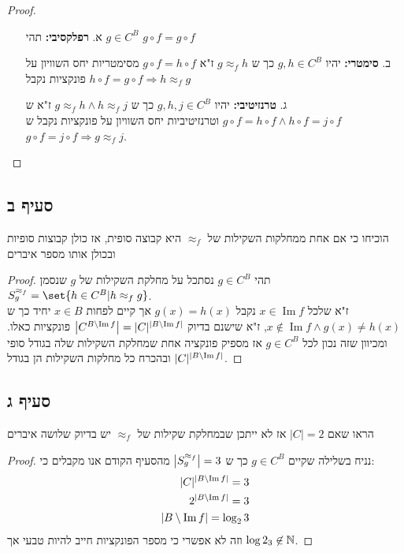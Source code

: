 \documentclass{article}
\DeclarePairedDelimiter\set\{\}
\DeclareMathOperator{\Img}{Im}
\begin{document}
	\begin{proof}
		\begin{itemize}
			\item[א.] \textbf{רפלקסיבי:} תהי $g \in C^B$ $g \circ f = g \circ f$
			\item[ב.] \textbf{סימטרי:} יהיו $g,h \in C^B$ כך ש $g \approx_f h$ ז"א $g \circ f = h \circ f$ מסימטריות יחס השוויון על פונקציות נקבל $h \circ f = g \circ f \Rightarrow h \approx_f g$
			\item[ג.] \textbf{טרנזיטיבי:} יהיו $g,h,j \in C^B$ כך ש $g \approx_f h \land h \approx_f j$ ז"א ש $g \circ f = h \circ f \land h \circ f = j \circ f$ וטרנזיטיביות יחס השוויון על פונקציות נקבל ש $g \circ f = j \circ f \Rightarrow g \approx_f j$.
		\end{itemize}
	\end{proof}

	\subsection*{סעיף ב}
	הוכיחו כי אם אחת ממחלקות השקילות של $\approx_f$ היא קבוצה סופית, אז כולן קבוצות סופיות ובכולן אותו מספר איברים

	\begin{proof}
		תהי $g \in C^B$ נסתכל על מחלקת השקילות של $g$ שנסמן $S^{\approx_f}_g = \set{h \in C^B| h \approx_f g}$. \\
		ז"א שלכל $x \in \Img f$ נקבל $g(x) = h(x)$ אך קיים לפחות $x \in B$ יחיד כך ש $x \not\in \Img f \land g(x) \neq h(x)$, ז"א שישנם בדיוק $\pip{C^{B \sub \Img f}} = |C|^{\pip{B \sub \Img f}}$ פונקציות כאלו.
		ומכיוון שזה נכון לכל $g \in C^B$ אז מספיק פונקציה אחת שמחלקת השקילות שלה בגודל סופי ובהכרח כל מחלקות השקילות הן בגודל $|C|^{\pip{B \sub \Img f}}$.
	\end{proof}

	\subsection*{סעיף ג}
	הראו שאם $|C| = 2$ אז לא ייתכן שבמחלקת שקילות של $\approx_f$ יש בדיוק שלושה איברים

	\begin{proof}
		נניח בשלילה שקיים $g \in C^B$ כך ש $\left| S^{\approx_f}_g \right| = 3$ מהסעיף הקודם אנו מקבלים כי:
		\begin{align*}
			|C|^{\pip{B \sub \Img f}} = 3 \\
			2^{\pip{B \sub \Img f}} = 3 \\
			\pip{B \sub \Img f} = \log_2{3}
		\end{align*}
		וזה לא אפשרי כי מספר הפונקציות חייב להיות טבעי אך $\log2_{3} \not\in \mathbb{N}$.
	\end{proof}
\end{document}
